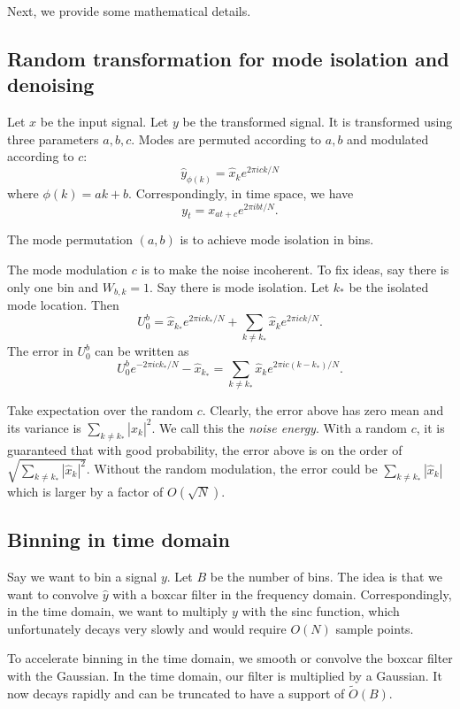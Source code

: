 \documentclass[10pt]{article}
\begin{document}
Next, we provide some mathematical details.

\subsection{Random transformation for mode isolation and denoising}\label{sec:transform}
Let $x$ be the input signal. Let $y$ be the transformed signal. It is transformed using three parameters $a,b,c$. Modes are permuted according to $a, b$ and modulated according to $c$:
$$\hat{y}_{\phi(k)} = \hat{x}_k e^{2\pi i ck/N}$$
where $\phi(k) = ak+b$. Correspondingly, in time space, we have
$$y_t = x_{at+c} e^{2\pi i bt/N}.$$

The mode permutation $(a,b)$ is to achieve mode isolation in bins.

The mode modulation $c$ is to make the noise incoherent. To fix ideas, say there is only one bin and $W_{b,k}=1$. Say there is mode isolation. Let $k_*$ be the isolated mode location. Then
$$U^b_0 = \hat{x}_{k_*}e^{2\pi i c k_*/N} + \sum_{k\neq k_*} \hat{x}_k e^{2\pi i c k/N}.$$
The error in $U^b_0$ can be written as
$$U^b_0 e^{-2\pi i c k_*/N} -\hat{x}_{k_*} = \sum_{k\neq k_*} \hat{x}_k e^{2\pi i c(k-k_*)/N}.$$

Take expectation over the random $c$. Clearly, the error above has zero mean and its variance is $\sum_{k\neq k_*} |\hat{x}_k|^2$. We call this the \emph{noise energy}. With a random $c$, it is guaranteed that with good probability, the error above is on the order of $\sqrt{\sum_{k\neq k_*} |\hat{x}_k|^2}$. Without the random modulation, the error could be $\sum_{k\neq k_*} |\hat{x}_k|$ which is larger by a factor of $O(\sqrt{N})$.

\subsection{Binning in time domain}

Say we want to bin a signal $y$. Let $B$ be the number of bins. The idea is that we want to convolve $\hat{y}$ with a boxcar filter in the frequency domain. Correspondingly, in the time domain, we want to multiply $y$ with the sinc function, which unfortunately decays very slowly and would require $O(N)$ sample points.

To accelerate binning in the time domain, we smooth or convolve the boxcar filter with the Gaussian. In the time domain, our filter is multiplied by a Gaussian. It now decays rapidly and can be truncated to have a support of $\tilde{O}(B)$.
\end{document}
